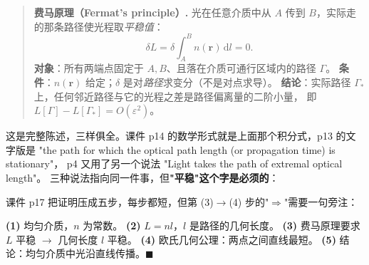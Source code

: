 \documentclass[11pt]{ctexart}
\begin{document}


\begin{quote}
\textbf{费马原理（Fermat's principle）.}\quad
光在任意介质中从 $A$ 传到 $B$，实际走的那条路径使光程取\emph{平稳值}：
\[
\delta L=\delta\!\int_{A}^{B}n(\mathbf{r})\,\mathrm{d}l=0 .
\]
\textbf{对象}：所有两端点固定于 $A,B$、且落在介质可通行区域内的路径 $\Gamma$。
\textbf{条件}：$n(\mathbf{r})$ 给定；$\delta$ 是对\emph{路径}求变分（不是对点求导）。
\textbf{结论}：实际路径 $\Gamma_*$ 上，任何邻近路径与它的光程之差是路径偏离量的二阶小量，
即 $L[\Gamma]-L[\Gamma_*]=O(\varepsilon^2)$。
\end{quote}

这是完整陈述，三样俱全。课件 p14 的数学形式就是上面那个积分式，p13 的文字版是
"the path for which the optical path length (or propagation time) is stationary"，
p4 又用了另一个说法 "Light takes the path of extremal optical length"。
三种说法指向同一件事，但\textbf{"平稳"这个字是必须的}：



课件 p17 把证明压成五步，每步都短，但第 (3)$\to$(4) 步的"$\Rightarrow$"需要一句旁注：

\textbf{(1)} 均匀介质，$n$ 为常数。\quad
\textbf{(2)} $L=nl$，$l$ 是路径的几何长度。\quad
\textbf{(3)} 费马原理要求 $L$ 平稳 $\to$ 几何长度 $l$ 平稳。\quad
\textbf{(4)} 欧氏几何公理：两点之间直线最短。\quad
\textbf{(5)} 结论：均匀介质中光沿直线传播。$\blacksquare$

\end{document}
